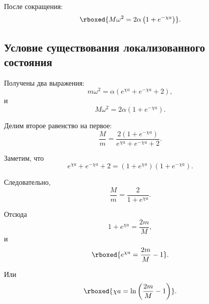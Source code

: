 \documentclass[../final.tex]{subfiles}
\begin{document}
После сокращения:
%
\begin{equation*}
    \rboxed{
        M\omega^2
        =
        2\alpha
        \left(
            1+e^{-\chi a}
        \right)
    }.
\end{equation*}



\subsection*{Условие существования локализованного состояния}

Получены два выражения:
%
\begin{equation*}
    m\omega^2
    =
    \alpha
    \left(
        e^{\chi a}
        +
        e^{-\chi a}
        +
        2
    \right),
\end{equation*}
%
и
%
\begin{equation*}
    M\omega^2
    =
    2\alpha
    \left(
        1+e^{-\chi a}
    \right).
\end{equation*}

Делим второе равенство на первое:
%
\begin{equation*}
    \frac{M}{m}
    =
    \frac{
        2(1+e^{-\chi a})
    }{
        e^{\chi a}
        +
        e^{-\chi a}
        +
        2
    }.
\end{equation*}

Заметим, что
%
\begin{equation*}
    e^{\chi a}
    +
    e^{-\chi a}
    +
    2
    =
    \left(
        1+e^{\chi a}
    \right)
    \left(
        1+e^{-\chi a}
    \right).
\end{equation*}

Следовательно,
%
\begin{equation*}
    \frac{M}{m}
    =
    \frac{2}{1+e^{\chi a}}.
\end{equation*}

Отсюда
%
\begin{equation*}
    1+e^{\chi a}
    =
    \frac{2m}{M},
\end{equation*}
%
и
%
\begin{equation*}
    \rboxed{
        e^{\chi a}
        =
        \frac{2m}{M}-1
    }.
\end{equation*}

Или
%
\begin{equation*}
    \rboxed{
        \chi a
        =
        \ln
        \left(
            \frac{2m}{M}-1
        \right)
    }.
\end{equation*}
\end{document}
